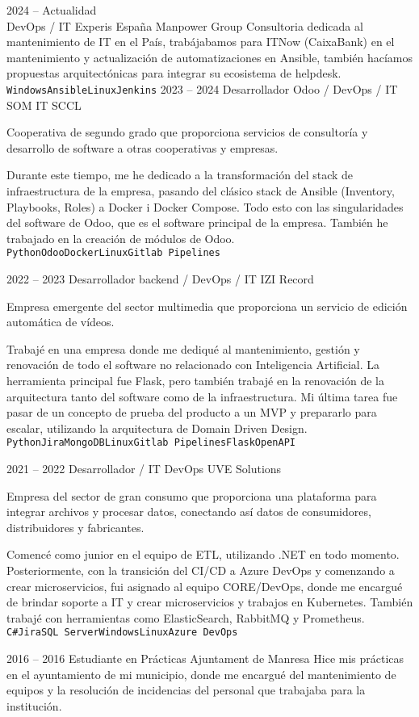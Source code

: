 \documentclass[9pt]{developercv} %
\begin{document}
\begin{entrylist}
	\entry
		{2024 -- Actualidad\\}
		{DevOps / IT}
		{Experis España Manpower Group}
		{Consultoria dedicada al mantenimiento de IT en el País, trabájabamos para ITNow (CaixaBank) en el mantenimiento y actualización de automatizaciones en Ansible, también  hacíamos propuestas arquitectónicas para integrar su ecosistema de helpdesk.
		\\ \texttt{Windows}\slashsep\texttt{Ansible}\slashsep\texttt{Linux}\slashsep\texttt{Jenkins}}
	\entry
		{2023 -- 2024}
		{Desarrollador Odoo / DevOps / IT}
		{SOM IT SCCL}
		{Cooperativa de segundo grado que proporciona servicios de consultoría y desarrollo de software a otras cooperativas y empresas.

		Durante este tiempo, me he dedicado a la transformación del stack de infraestructura de la empresa, pasando del clásico stack de Ansible (Inventory, Playbooks, Roles) a Docker i Docker Compose. Todo esto con las singularidades del software de Odoo, que es el software principal de la empresa. También he trabajado en la creación de módulos de Odoo.
		\\ \texttt{Python}\slashsep\texttt{Odoo}\slashsep\texttt{Docker}\slashsep\texttt{Linux}\slashsep\texttt{Gitlab Pipelines}
		}
	\entry
		{2022 -- 2023}
		{Desarrollador backend / DevOps / IT}
		{IZI Record}
		{Empresa emergente del sector multimedia que proporciona un servicio de edición automática de vídeos.

		Trabajé en una empresa donde me dediqué al mantenimiento, gestión y renovación de todo el software no relacionado con Inteligencia Artificial. La herramienta principal fue Flask, pero también trabajé en la renovación de la arquitectura tanto del software como de la infraestructura. Mi última tarea fue pasar de un concepto de prueba del producto a un MVP y prepararlo para escalar, utilizando la arquitectura de Domain Driven Design.
		\\ \texttt{Python}\slashsep\texttt{Jira}\slashsep\texttt{MongoDB}\slashsep\texttt{Linux}\slashsep\texttt{Gitlab Pipelines}\slashsep\texttt{Flask}\slashsep\texttt{OpenAPI}}
	\entry
		{2021 -- 2022}
		{Desarrollador / IT DevOps}
		{UVE Solutions}
		{Empresa del sector de gran consumo que proporciona una plataforma para integrar archivos y procesar datos, conectando así datos de consumidores, distribuidores y fabricantes.

		Comencé como junior en el equipo de ETL, utilizando .NET en todo momento. Posteriormente, con la transición del CI/CD a Azure DevOps y comenzando a crear microservicios, fui asignado al equipo CORE/DevOps, donde me encargué de brindar soporte a IT y crear microservicios y trabajos en Kubernetes. También trabajé con herramientas como ElasticSearch, RabbitMQ y Prometheus.
		\\ \texttt{C\#}\slashsep\texttt{Jira}\slashsep\texttt{SQL Server}\slashsep\texttt{Windows}\slashsep\texttt{Linux}\slashsep\texttt{Azure DevOps}}
	\entry
		{2016 -- 2016}
		{Estudiante en Prácticas}
		{Ajuntament de Manresa}
		{ 
			Hice mis prácticas en el ayuntamiento de mi municipio, donde me encargué del mantenimiento de equipos y la resolución de incidencias del personal que trabajaba para la institución.}


\end{entrylist}
\end{document}
